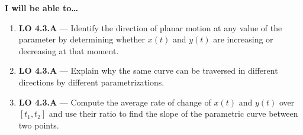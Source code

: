 \documentclass[10pt]{article}
\begin{document}
\namedateperiod

\vspace{0.10in}

\begin{objectivebox}
\textbf{I will be able to\ldots}
\begin{enumerate}[leftmargin=1.5em, itemsep=4pt]
  \item \textbf{LO 4.3.A} --- Identify the direction of planar motion
    at any value of the parameter by determining whether $x(t)$ and
    $y(t)$ are increasing or decreasing at that moment. \writeline
  \item \textbf{LO 4.3.A} --- Explain why the same curve can be traversed
    in different directions by different parametrizations. \writeline
  \item \textbf{LO 4.3.A} --- Compute the average rate of change of $x(t)$
    and $y(t)$ over $[t_1, t_2]$ and use their ratio to find the slope
    of the parametric curve between two points. \writeline
\end{enumerate}
\end{objectivebox}

\vspace{0.08in}
\end{document}
